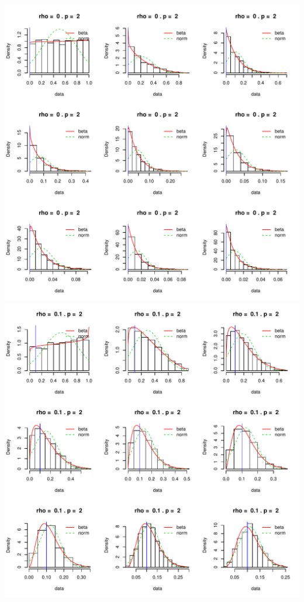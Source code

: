 \documentclass[]{article}
\begin{document}
\includegraphics{2016_w09_files/figure-latex/unnamed-chunk-14-1.pdf}
\includegraphics{2016_w09_files/figure-latex/unnamed-chunk-14-2.pdf}
\end{document}
